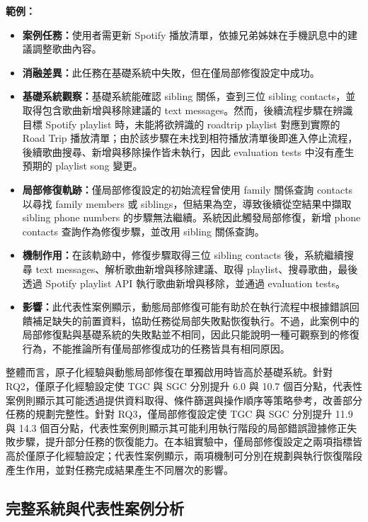 \begin{ZhChapter}
\noindent\textbf{範例：}
\begin{itemize}
    \item \textbf{案例任務：}使用者需更新 Spotify 播放清單，依據兄弟姊妹在手機訊息中的建議調整歌曲內容。
    \item \textbf{消融差異：}此任務在基礎系統中失敗，但在僅局部修復設定中成功。
    \item \textbf{基礎系統觀察：}基礎系統能確認 sibling 關係，查到三位 sibling contacts，並取得包含歌曲新增與移除建議的 text messages。然而，後續流程步驟在辨識目標 Spotify playlist 時，未能將欲辨識的 roadtrip playlist 對應到實際的 Road Trip 播放清單；由於該步驟在未找到相符播放清單後即進入停止流程，後續歌曲搜尋、新增與移除操作皆未執行，因此 evaluation tests 中沒有產生預期的 playlist song 變更。
    \item \textbf{局部修復軌跡：}僅局部修復設定的初始流程曾使用 family 關係查詢 contacts 以尋找 family members 或 siblings，但結果為空，導致後續從空結果中擷取 sibling phone numbers 的步驟無法繼續。系統因此觸發局部修復，新增 phone contacts 查詢作為修復步驟，並改用 sibling 關係查詢。
    \item \textbf{機制作用：}在該軌跡中，修復步驟取得三位 sibling contacts 後，系統繼續搜尋 text messages、解析歌曲新增與移除建議、取得 playlist、搜尋歌曲，最後透過 Spotify playlist API 執行歌曲新增與移除，並通過 evaluation tests。
    \item \textbf{影響：}此代表性案例顯示，動態局部修復可能有助於在執行流程中根據錯誤回饋補足缺失的前置資料，協助任務從局部失敗點恢復執行。不過，此案例中的局部修復點與基礎系統的失敗點並不相同，因此只能說明一種可觀察到的修復行為，不能推論所有僅局部修復成功的任務皆具有相同原因。
\end{itemize}

整體而言，原子化經驗與動態局部修復在單獨啟用時皆高於基礎系統。針對 RQ2，僅原子化經驗設定使 TGC 與 SGC 分別提升 6.0 與 10.7 個百分點，代表性案例則顯示其可能透過提供資料取得、條件篩選與操作順序等策略參考，改善部分任務的規劃完整性。針對 RQ3，僅局部修復設定使 TGC 與 SGC 分別提升 11.9 與 14.3 個百分點，代表性案例則顯示其可能利用執行階段的局部錯誤證據修正失敗步驟，提升部分任務的恢復能力。在本組實驗中，僅局部修復設定之兩項指標皆高於僅原子化經驗設定；代表性案例顯示，兩項機制可分別在規劃與執行恢復階段產生作用，並對任務完成結果產生不同層次的影響。

\subsection{完整系統與代表性案例分析}
\label{sec:ablation_case_analysis}


\end{ZhChapter}
